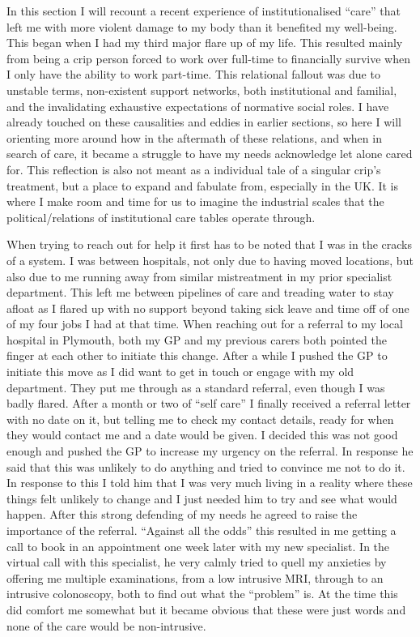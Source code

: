 In this section I will recount a recent experience of institutionalised
``care'' that left me with more violent damage to my body than it
benefited my well-being. This began when I had my third major flare up
of my life. This resulted mainly from being a crip person forced to work
over full-time to financially survive when I only have the ability to
work part-time. This relational fallout was due to unstable terms,
non-existent support networks, both institutional and familial, and the
invalidating exhaustive expectations of normative social roles. I have
already touched on these causalities and eddies in earlier sections, so
here I will orienting more around how in the aftermath of these
relations, and when in search of care, it became a struggle to have my
needs acknowledge let alone cared for. This reflection is also not meant
as a individual tale of a singular crip's treatment, but a place to
expand and fabulate from, especially in the UK. It is where I make room
and time for us to imagine the industrial scales that the
political/relations of institutional care tables operate through.

When trying to reach out for help it first has to be noted that I was in
the cracks of a system. I was between hospitals, not only due to having
moved locations, but also due to me running away from similar
mistreatment in my prior specialist department. This left me between
pipelines of care and treading water to stay afloat as I flared up with
no support beyond taking sick leave and time off of one of my four jobs
I had at that time. When reaching out for a referral to my local
hospital in Plymouth, both my GP and my previous carers both pointed the
finger at each other to initiate this change. After a while I pushed the
GP to initiate this move as I did want to get in touch or engage with my
old department. They put me through as a standard referral, even though
I was badly flared. After a month or two of ``self care'' I finally
received a referral letter with no date on it, but telling me to check
my contact details, ready for when they would contact me and a date
would be given. I decided this was not good enough and pushed the GP to
increase my urgency on the referral. In response he said that this was
unlikely to do anything and tried to convince me not to do it. In
response to this I told him that I was very much living in a reality
where these things felt unlikely to change and I just needed him to try
and see what would happen. After this strong defending of my needs he
agreed to raise the importance of the referral. ``Against all the odds''
this resulted in me getting a call to book in an appointment one week
later with my new specialist. In the virtual call with this specialist,
he very calmly tried to quell my anxieties by offering me multiple
examinations, from a low intrusive MRI, through to an intrusive
colonoscopy, both to find out what the ``problem'' is. At the time this
did comfort me somewhat but it became obvious that these were just words
and none of the care would be non-intrusive.

